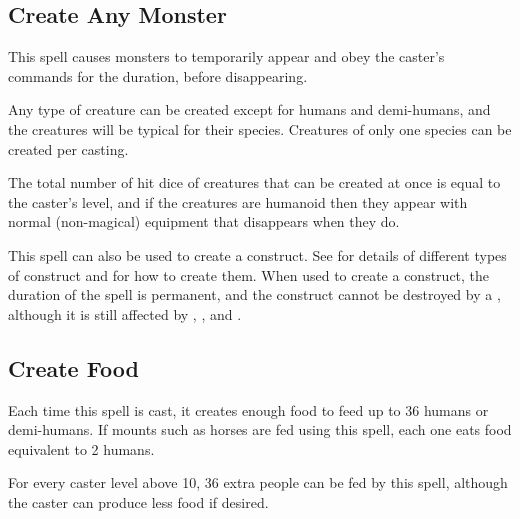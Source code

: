 \begin{multicols*}{2}
\subsection{Create Any Monster}\label{spell:Create Any Monster}

This spell causes monsters to temporarily appear and obey the caster’s commands for the duration, before disappearing.

Any type of creature can be created except for humans and demi-humans, and the creatures will be typical for their species. Creatures of only one species can be created per casting.

The total number of hit dice of creatures that can be created at once is equal to the caster’s level, and if the creatures are humanoid then they appear with normal (non-magical) equipment that disappears when they do.

This spell can also be used to create a construct. See  for details of different types of construct and  for how to create them. When used to create a construct, the duration of the spell is permanent, and the construct cannot be destroyed by a , although it is still affected by , , and .

\subsection{Create Food}\label{spell:Create Food}

Each time this spell is cast, it creates enough food to feed up to 36 humans or demi-humans. If mounts such as horses are fed using this spell, each one eats food equivalent to 2 humans.

For every caster level above 10, 36 extra people can be fed by this spell, although the caster can produce less food if desired.


\end{multicols*}
